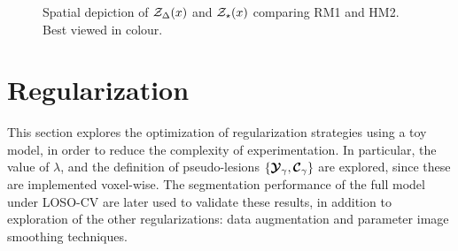 \begin{figure}
 \\[0.5em]
  \\[0.5em]
  \\[0.5em]
  \\[0.5em]
  \\[0.5em]
  \caption{Spatial depiction of $\mathcal{Z}_{\Delta}(x)$ and $\mathcal{Z}_{\star}(x)$ comparing RM1 and HM2.
  Best viewed in colour.}%
  \label{fig:jsep-diff-x-narm}
\end{figure}

\clearpage
\section{Regularization}
This section explores the optimization of regularization strategies using a toy model,
in order to reduce the complexity of experimentation.
In particular,
the value of $\lambda$,
and the definition of pseudo-lesions $\{\bm{\mathcal{Y}}_{\gamma},\bm{\mathcal{C}}_{\gamma}\}$
are explored, since these are implemented voxel-wise.
The segmentation performance of the full model under LOSO-CV
are later used to validate these results,
in addition to exploration of the other regularizations:
data augmentation and parameter image smoothing techniques.
